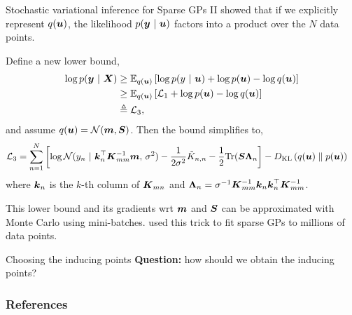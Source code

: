 \documentclass[aspectratio=169]{beamer}
\begin{document}
\begin{frame}{Stochastic variational inference for Sparse GPs II}
    \citet{Hensman2013-cf} showed that if we explicitly represent $q(\boldsymbol{u})$, the likelihood $p(\boldsymbol{y} ~\vert~ \boldsymbol{u})$ factors into a product over the $N$ data points. 
    
    Define a new lower bound, 
    \begin{align}
        \log p(\boldsymbol{y} ~\vert~ \boldsymbol{X}) &\geq 
        \mathbb{E}_{q(\boldsymbol{u})} \left[ \log p(y ~\vert~ \boldsymbol{u}) + \log p(\boldsymbol{u}) - \log q(\boldsymbol{u}) \right] \\
        &\geq \mathbb{E}_{q(\boldsymbol{u})} \left[ \mathcal{L}_1 + \log p(\boldsymbol{u}) - \log q(\boldsymbol{u}) \right] \\
        &\triangleq \mathcal{L}_3,
    \end{align}
    and assume $q(\boldsymbol{u}) = \mathcal{N}(\boldsymbol{m}, \boldsymbol{S})$.  Then the bound simplifies to,
    \begin{align}
        \mathcal{L}_3 &= \sum_{n=1}^N \left[ \log \mathcal{N}(y_n ~\vert~ \boldsymbol{k}_n^\top \boldsymbol{K}_{mm}^{-1} \boldsymbol{m}, \, \sigma^2) 
        -\frac{1}{2\sigma^2} \tilde{K}_{n,n} - \frac{1}{2} \textrm{Tr}(\boldsymbol{S} \boldsymbol{\Lambda}_{n} \right] 
        - D_{\textrm{KL}}\left(q(\boldsymbol{u})\;\|\;p(\boldsymbol{u})\right)
    \end{align}
    where $\boldsymbol{k}_n$ is the $k$-th column of $\boldsymbol{K}_{mn}$ and $\boldsymbol{\Lambda}_n = \sigma^{-1} \boldsymbol{K}_{mm}^{-1} \boldsymbol{k}_n \boldsymbol{k}_n^\top \boldsymbol{K}_{mm}^{-1}$.
    
    This lower bound and its gradients wrt $\boldsymbol{m}$ and $\boldsymbol{S}$ can be approximated with Monte Carlo using mini-batches. \citet{Hensman2013-cf} used this trick to fit sparse GPs to millions of data points.
\end{frame}

\begin{frame}[t]{Choosing the inducing points}
    \textbf{Question: } how should we obtain the inducing points?
\end{frame}

\begin{frame}[t,allowframebreaks]
        \frametitle{References}
        
        
\end{frame}
\end{document}
